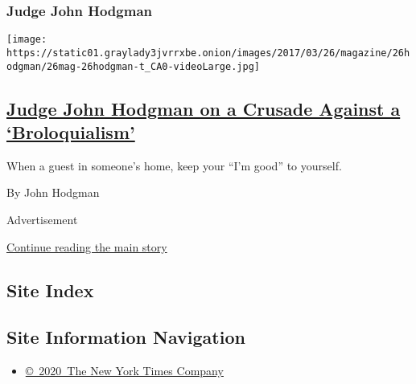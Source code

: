 \begin{enumerate}
{  \subsubsection{Judge John Hodgman}\label{judge-john-hodgman}}

  \texttt{[image: https://static01.graylady3jvrrxbe.onion/images/2017/03/26/magazine/26hodgman/26mag-26hodgman-t\_CA0-videoLarge.jpg]}

  \hypertarget{judge-john-hodgman-on-a-crusade-against-a-broloquialism}{%
  \subsection{\texorpdfstring{\href{/2017/03/24/magazine/judge-john-hodgman-on-a-crusade-against-a-broloquialism.html}{Judge
  John Hodgman on a Crusade Against a
  `Broloquialism'}}{Judge John Hodgman on a Crusade Against a `Broloquialism'}}\label{judge-john-hodgman-on-a-crusade-against-a-broloquialism}}

  When a guest in someone's home, keep your ``I'm good'' to yourself.

  By John Hodgman
\end{enumerate}

Advertisement

\protect\hyperlink{after-mid1}{Continue reading the main story}

\hypertarget{site-index}{%
\subsection{Site Index}\label{site-index}}

\hypertarget{site-information-navigation}{%
\subsection{Site Information
Navigation}\label{site-information-navigation}}

\begin{itemize}
\tightlist
\item
  \href{https://help.nytimes3xbfgragh.onion/hc/en-us/articles/115014792127-Copyright-notice}{©~2020~The
  New York Times Company}
\end{itemize}

